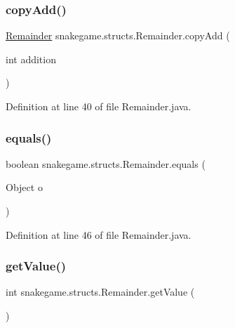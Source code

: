 \subsubsection{\texorpdfstring{copy\+Add()}{copyAdd()}}
{\footnotesize\ttfamily \mbox{\hyperlink{classsnakegame_1_1structs_1_1_remainder}{Remainder}} snakegame.\+structs.\+Remainder.\+copy\+Add (\begin{DoxyParamCaption}\item[{int}]{addition }\end{DoxyParamCaption})}



Definition at line 40 of file Remainder.\+java.

\mbox{\label{classsnakegame_1_1structs_1_1_remainder_a5d11bc092dc689a2ddcff2947c27c679}} 
\subsubsection{\texorpdfstring{equals()}{equals()}}
{\footnotesize\ttfamily boolean snakegame.\+structs.\+Remainder.\+equals (\begin{DoxyParamCaption}\item[{Object}]{o }\end{DoxyParamCaption})}



Definition at line 46 of file Remainder.\+java.

\mbox{\label{classsnakegame_1_1structs_1_1_remainder_ad44771e1b21d1bd2ecb4b1f676395001}} 
\subsubsection{\texorpdfstring{get\+Value()}{getValue()}}
{\footnotesize\ttfamily int snakegame.\+structs.\+Remainder.\+get\+Value (\begin{DoxyParamCaption}{ }\end{DoxyParamCaption})}



